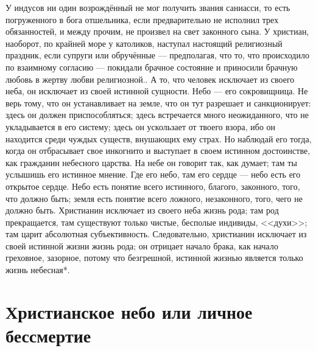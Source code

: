 \documentclass[12pt,oneside]{book}
\begin{document}
{У индусов ни один возрождённый не мог получить звания саниасси, то есть погруженного в бога отшельника, если предварительно не исполнил трех обязанностей, и между прочим, не произвел на свет законного сына. У христиан, наоборот, по крайней море у католиков, наступал настоящий религиозный праздник, если супруги или обручённые --- предполагая, что то, что происходило по взаимному согласию --- покидали брачное состояние и приносили брачную любовь в жертву любви религиозной.}\let\thefootnote\svthefootnote. А то, что человек исключает из своего неба, он исключает из своей истинной сущности. Небо --- его сокровищница. Не верь тому, что он устанавливает на земле, что он тут разрешает и санкционирует: здесь он должен приспособляться; здесь встречается много неожиданного, что не укладывается в его систему; здесь он ускользает от твоего взора, ибо он находится среди чуждых существ, внушающих ему страх. Но наблюдай его тогда, когда он отбрасывает свое инкогнито и выступает в своем истинном достоинстве, как гражданин небесного царства. На небе он говорит так, как думает; там ты услышишь его истинное мнение. Где его небо, там его сердце --- небо есть его открытое сердце. Небо есть понятие всего истинного, благого, законного, того, что должно быть; земля есть понятие всего ложного, незаконного, того, чего не должно быть. Христианин исключает из своего неба жизнь рода; там род прекращается, там существуют только чистые, бесполые индивиды, <<духи>>; там царит абсолютная субъективность. Следовательно, христианин исключает из своей истинной жизни жизнь рода; он отрицает начало брака, как начало греховное, зазорное, потому что безгрешной, истинной жизнью является только жизнь небесная*\let\svthefootnote\thefootnote\let\thefootnote\relax{}\let\thefootnote\svthefootnote.









\chapter{Христианское небо или личное бессмертие}
\end{document}

